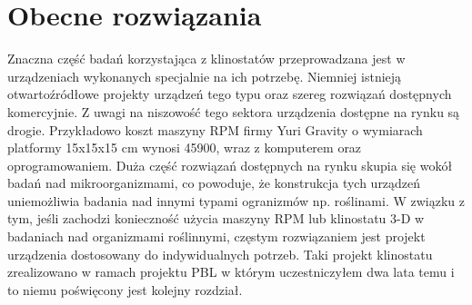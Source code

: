 \section{Obecne rozwiązania}

Znaczna część badań korzystająca z klinostatów przeprowadzana jest w urządzeniach
 wykonanych specjalnie na ich potrzebę. Niemniej istnieją otwartoźródłowe projekty urządzeń
  tego typu oraz szereg rozwiązań dostępnych komercyjnie. Z uwagi na niszowość tego sektora
   urządzenia dostępne na rynku są drogie. Przykładowo koszt maszyny RPM firmy Yuri Gravity
    o wymiarach platformy 15x15x15 cm wynosi \SI{45900}{\geneuro}, wraz z komputerem oraz oprogramowaniem. Duża część rozwiązań dostępnych na rynku skupia
     się wokół badań nad mikroorganizmami, co powoduje, że konstrukcja tych urządzeń
      uniemożliwia badania nad innymi typami ogranizmów np. roślinami. W związku z tym, jeśli
       zachodzi konieczność użycia maszyny RPM lub klinostatu 3-D w badaniach nad
        organizmami roślinnymi, częstym rozwiązaniem jest projekt urządzenia dostosowany do
         indywidualnych potrzeb. Taki projekt klinostatu zrealizowano w ramach projektu PBL w którym
          uczestniczyłem dwa lata temu i to niemu poświęcony jest kolejny rozdział.
          
